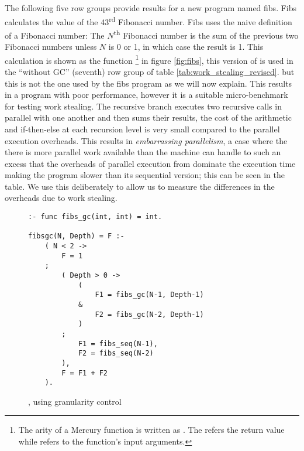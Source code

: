 The following five row groups provide results for a new program named fibs.
Fibs calculates the value of the 43\textsuperscript{rd} Fibonacci number.
Fibs uses the naive definition of a Fibonacci number:  The
$N$\textsuperscript{th} Fibonacci number is the sum of the previous two
Fibonacci numbers unless $N$ is 0 or 1, in which case the result is 1.
This calculation is shown as the function \fibs\footnote{
    The arity of a Mercury function is written as .
    The  refers the return value while  refers to the
    function's input arguments.}
in figure \ref{fig:fibs},
this version of \fibs is used in the ``without GC'' (seventh) row group of table
\ref{tab:work_stealing_revised}.
but this is not the one used by the fibs program as we will now explain.
This results in a program with poor performance,
however it is a suitable micro-benchmark for testing work stealing.
The recursive branch executes two recursive calls in parallel with one
another and then sums their results,
the cost of the arithmetic and if-then-else at each recursion level is very
small compared to the parallel execution overheads.
This results in \emph{embarrassing parallelism},
a case where the there is more parallel work available than the machine can
handle to such an excess that the overheads of parallel execution from
dominate the execution time
making the program slower than its sequential version;
this can be seen in the table.
We use this deliberately to allow us to measure the differences in the
overheads due to work stealing.

\begin{figure}
\begin{verbatim}
:- func fibs_gc(int, int) = int.

fibsgc(N, Depth) = F :-
    ( N < 2 ->
        F = 1
    ;
        ( Depth > 0 ->
            (
                F1 = fibs_gc(N-1, Depth-1)
            &
                F2 = fibs_gc(N-2, Depth-1)
            )
        ;
            F1 = fibs_seq(N-1),
            F2 = fibs_seq(N-2)
        ),
        F = F1 + F2
    ).
\end{verbatim}
\caption{\fibsgc, \fibs using granularity control}
\label{fig:fibsgc}
\end{figure}


